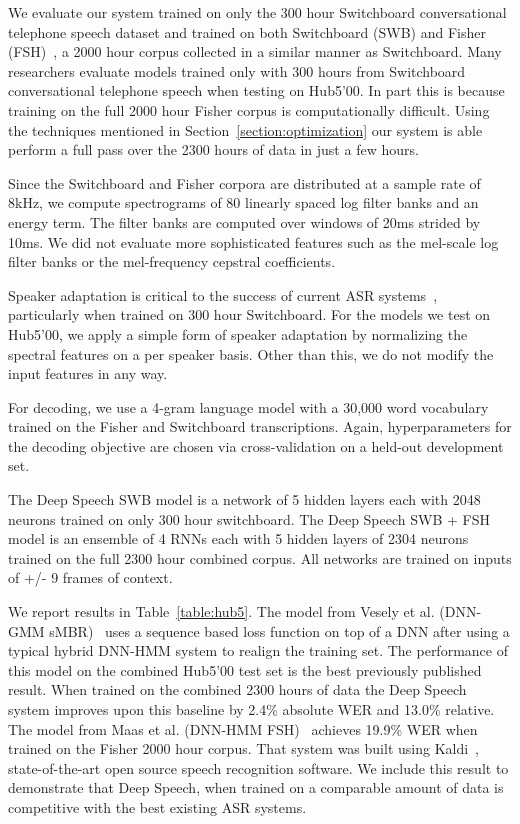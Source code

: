\documentclass{article}
\begin{document}
We evaluate our system trained on only the 300 hour Switchboard conversational
telephone speech dataset and trained on both Switchboard (SWB) and Fisher
(FSH)~\cite{Cieri2004Fisher}, a 2000 hour corpus collected in a similar manner
as Switchboard.  Many researchers evaluate models trained only with 300 hours
from Switchboard conversational telephone speech when testing on Hub5'00.  In
part this is because training on the full 2000 hour Fisher corpus is
computationally difficult.  Using the techniques mentioned in
Section~\ref{section:optimization} our system is able perform a full pass over
the 2300 hours of data in just a few hours.

Since the Switchboard and Fisher corpora are distributed at a sample rate of
8kHz, we compute spectrograms of 80 linearly spaced log filter banks and an
energy term.  The filter banks are computed over windows of 20ms strided by
10ms.  We did not evaluate more sophisticated features such as the mel-scale
log filter banks or the mel-frequency cepstral coefficients.

Speaker adaptation is critical to the success of current ASR
systems~\cite{Povey2013,sainath2013cnn}, particularly when trained on 300 hour
Switchboard.  For the models we test on Hub5'00, we apply a simple form of
speaker adaptation by normalizing the spectral features on a per speaker basis.
Other than this, we do not modify the input features in any way.  

For decoding, we use a 4-gram language model with a 30,000 word vocabulary
trained on the Fisher and Switchboard transcriptions.  Again, hyperparameters
for the decoding objective are chosen via cross-validation on a held-out
development set.

The Deep Speech SWB model is a network of 5 hidden layers each with 2048
neurons trained on only 300 hour switchboard.  The Deep Speech SWB + FSH model
is an ensemble of 4 RNNs each with 5 hidden layers of 2304 neurons trained on
the full 2300 hour combined corpus.  All networks are trained on inputs of +/-
9 frames of context.

We report results in Table~\ref{table:hub5}. The model from Vesely et al.
(DNN-GMM sMBR)~\cite{Povey2013} uses a sequence based loss function on top of a
DNN after using a typical hybrid DNN-HMM system to realign the training set.
The performance of this model on the combined Hub5'00 test set is the best
previously published result.  When trained on the combined 2300 hours of data
the Deep Speech system improves upon this baseline by 2.4\% absolute WER and
13.0\% relative.  The model from Maas et al. (DNN-HMM
FSH)~\cite{maas2014largeam} achieves 19.9\% WER when trained on the Fisher 2000
hour corpus.  That system was built using Kaldi~\cite{Povey2011},
state-of-the-art open source speech recognition software.  We include this
result to demonstrate that Deep Speech, when trained on a comparable amount of
data is competitive with the best existing ASR systems.
\end{document}
